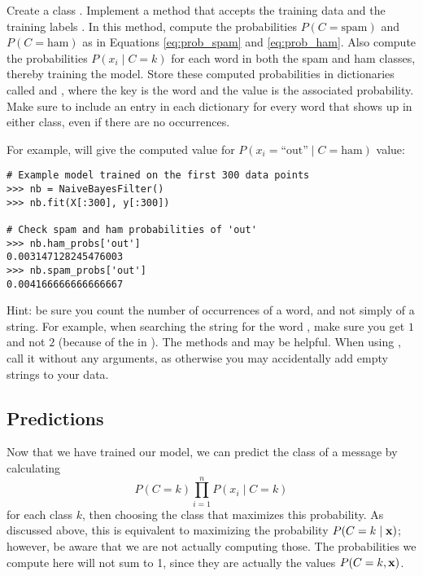 \begin{problem}\label{prob:naivebayes:categorical-train}
Create a class .
Implement a method  that accepts the training data  and the training labels .
In this method, compute the probabilities $P(C=\text{spam})$ and $P(C=\text{ham})$ as in Equations \eqref{eq:prob_spam} and \eqref{eq:prob_ham}.
Also compute the probabilities $P(x_i \mid C=k)$ for each word in both the spam and ham classes, thereby training the model.
Store these computed probabilities in dictionaries called  and , where the key is the word and the value is the associated probability.
 Make sure to include an entry in each dictionary for every word that shows up in either class, even if there are no occurrences.

For example,  will give the computed value for $P(x_i=\text{``out''} \mid C=\text{ham})$ value:
\begin{lstlisting}
# Example model trained on the first 300 data points
>>> nb = NaiveBayesFilter()
>>> nb.fit(X[:300], y[:300])

# Check spam and ham probabilities of 'out'
>>> nb.ham_probs['out']
0.003147128245476003
>>> nb.spam_probs['out']
0.004166666666666667
\end{lstlisting}

Hint: be sure you count the number of occurrences of a word, and not simply of a string. For example, when searching the string  for the word , make sure you get $1$ and not $2$ (because of the  in ).
The methods  and  may be helpful.
When using , call it without any arguments, as otherwise you may accidentally add empty strings to your data.
\end{problem}

\subsection*{Predictions}
Now that we have trained our model, we can predict the class of a message by calculating
\[
P(C=k)\prod_{i=1}^n P(x_i \mid C=k)
\]
for each class $k$, then choosing the class that maximizes this probability.
As discussed above, this is equivalent to maximizing the probability $P(C=k \mid \mathbf{x})$; however, be aware that we are not actually computing those.
The probabilities we compute here will not sum to 1, since they are actually the values $P(C=k,\mathbf{x})$.

